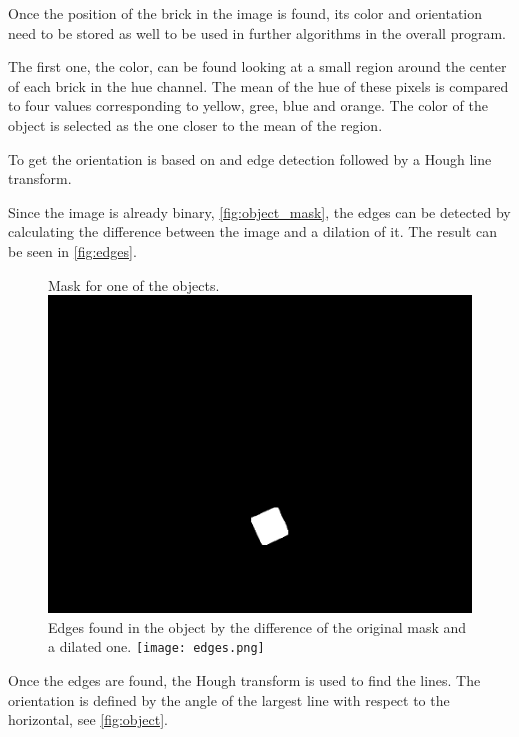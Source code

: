 Once the position of the brick in the image is found, its color and orientation need to be stored as well to be used in further algorithms in the overall program.

The first one, the color, can be found looking at a small region around the center of each brick in the hue channel. The mean of the hue of these pixels is compared to four values corresponding to yellow, gree, blue and orange. The color of the object is selected as the one closer to the mean of the region.

To get the orientation is based on and edge detection followed by a Hough line transform. 

Since the image is already binary, \autoref{fig:object_mask}, the edges can be detected by calculating the difference between the image and a dilation of it. The result can be seen in \autoref{fig:edges}.


\begin{figure}[H]
    \captionbox  %
    {
        Mask for one of the objects.              
        \label{fig:object_mask}                                  
    }                                                                 
    {                                                                  
        \includegraphics[width=.4\textwidth]{figures/object_mask.png}         
    }                                                                    
    \hspace{5pt}                                                          
    \captionbox
    {       
        Edges found in the object by the difference of the original mask and a dilated one.
        \label{fig:edges}                                     
    }
    {
        \texttt{[image: edges.png]}            
    }                                                                              
\end{figure}

Once the edges are found, the Hough transform is used to find the lines. The orientation is defined by the angle of the largest line with respect to the horizontal, see \autoref{fig:object}.

